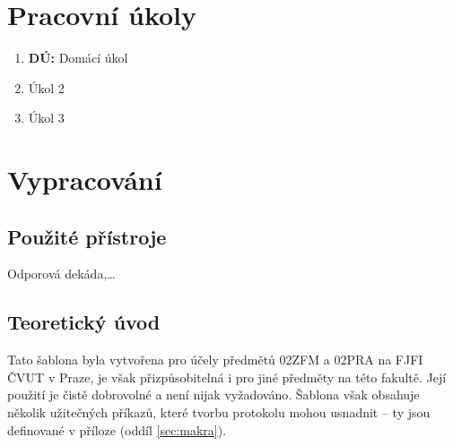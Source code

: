 \section{Pracovní úkoly}

\begin{enumerate}
\item \textbf{DÚ:} Domácí úkol

\item Úkol 2

\item Úkol 3
\end{enumerate}

\section{Vypracování}


	\subsection{Použité přístroje}
		Odporová dekáda,\dots

	\subsection{Teoretický úvod}
		Tato šablona byla vytvořena pro účely předmětů 02ZFM a 02PRA na FJFI ČVUT v Praze, je však přizpůsobitelná i pro jiné předměty na této fakultě. Její použití je čistě dobrovolné a není nijak vyžadováno. Šablona však obsahuje několik užitečných příkazů, které tvorbu protokolu mohou usnadnit -- ty jsou definované v příloze (oddíl \ref{sec:makra}).
		 
